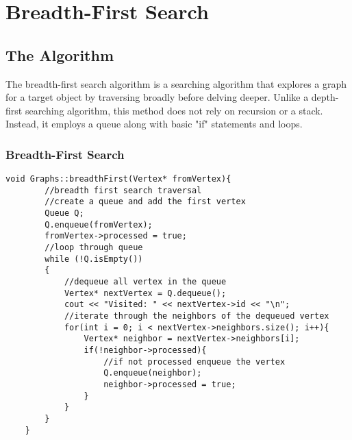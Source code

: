 \documentclass[letterpaper, 10pt,DIV=13]{scrartcl}
\numberwithin{equation}{section} %
\numberwithin{figure}{section} %
\numberwithin{table}{section} %
\begin{document}
\pagebreak

\section{Breadth-First Search}

\subsection{The Algorithm}
The breadth-first search algorithm is a searching algorithm that explores a graph for a target object by traversing broadly before delving deeper. Unlike a depth-first searching algorithm, this method does not rely on recursion or a stack. Instead, it employs a queue along with basic "if" statements and loops.

\subsubsection*{Breadth-First Search}
    \lstset{numbers=left, numberstyle=\tiny, stepnumber=1, numbersep=5pt, basicstyle=\footnotesize\ttfamily}
    \begin{lstlisting}[frame=single, ]
   void Graphs::breadthFirst(Vertex* fromVertex){
        //breadth first search traversal
        //create a queue and add the first vertex
        Queue Q;
        Q.enqueue(fromVertex);
        fromVertex->processed = true;
        //loop through queue
        while (!Q.isEmpty())
        {
            //dequeue all vertex in the queue
            Vertex* nextVertex = Q.dequeue();
            cout << "Visited: " << nextVertex->id << "\n";
            //iterate through the neighbors of the dequeued vertex
            for(int i = 0; i < nextVertex->neighbors.size(); i++){
                Vertex* neighbor = nextVertex->neighbors[i];
                if(!neighbor->processed){
                    //if not processed enqueue the vertex
                    Q.enqueue(neighbor);
                    neighbor->processed = true;
                }
            }
        }
    }

\end{lstlisting}
\end{document}
